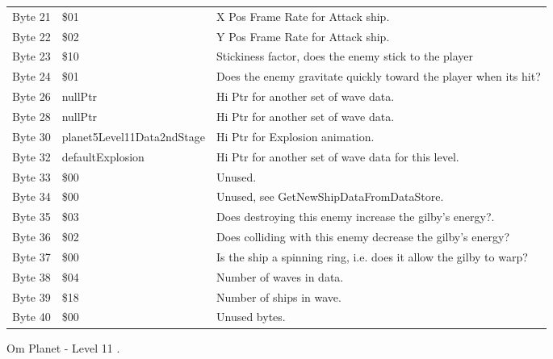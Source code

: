 \begin{figure}[H]
{\begin{adjustbox}{width=12cm}
\begin{tabular}{lll}
 Byte 21 & \$01                        & X Pos Frame Rate for Attack ship.                                  \\
 Byte 22 & \$02                        & Y Pos Frame Rate for Attack ship.                                  \\
 Byte 23 & \$10                        & Stickiness factor, does the enemy stick to the player              \\
 Byte 24 & \$01                        & Does the enemy gravitate quickly toward the player when its hit?   \\
 Byte 26 & nullPtr                    & Hi Ptr for another set of wave data.                               \\
 Byte 28 & nullPtr                    & Hi Ptr for another set of wave data.                               \\
 Byte 30 & planet5Level11Data2ndStage & Hi Ptr for Explosion animation.                                    \\
 Byte 32 & defaultExplosion           & Hi Ptr for another set of wave data for this level.                \\
 Byte 33 & \$00                        & Unused.                                                            \\
 Byte 34 & \$00                        & Unused, see GetNewShipDataFromDataStore.                           \\
 Byte 35 & \$03                        & Does destroying this enemy increase the gilby's energy?.           \\
 Byte 36 & \$02                        & Does colliding with this enemy decrease the gilby's energy?        \\
 Byte 37 & \$00                        & Is the ship a spinning ring, i.e. does it allow the gilby to warp? \\
 Byte 38 & \$04                        & Number of waves in data.                                           \\
 Byte 39 & \$18                        & Number of ships in wave.                                           \\
 Byte 40 & \$00                        & Unused bytes.                                                      \\
\bottomrule
\end{tabular}

  \end{adjustbox}

  }\caption*{Om Planet - Level 11
.}
\end{figure}

